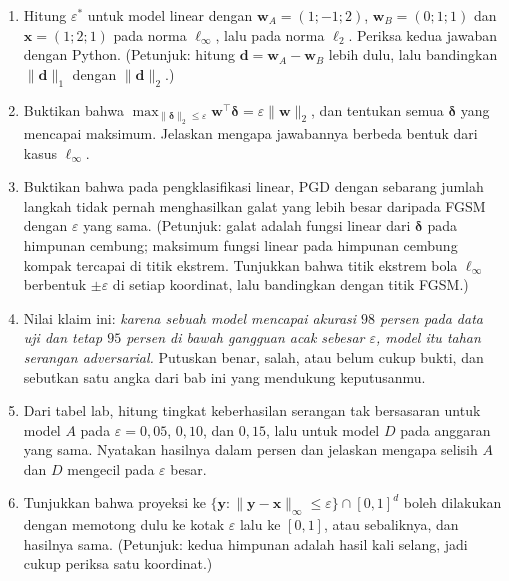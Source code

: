 \begin{latihan}
\begin{enumerate}
  \item Hitung $\varepsilon^{*}$ untuk model linear dengan
        $\mathbf{w}_A=(1;-1;2)$, $\mathbf{w}_B=(0;1;1)$ dan
        $\mathbf{x}=(1;2;1)$ pada norma $\ell_\infty$, lalu pada norma $\ell_2$.
        Periksa kedua jawaban dengan Python. (Petunjuk: hitung
        $\mathbf{d}=\mathbf{w}_A-\mathbf{w}_B$ lebih dulu, lalu bandingkan
        $\lVert\mathbf{d}\rVert_1$ dengan $\lVert\mathbf{d}\rVert_2$.)

  \item Buktikan bahwa $\max_{\lVert\boldsymbol{\delta}\rVert_2\le\varepsilon}
        \mathbf{w}^{\top}\boldsymbol{\delta}=\varepsilon\lVert\mathbf{w}\rVert_2$,
        dan tentukan semua $\boldsymbol{\delta}$ yang mencapai maksimum. Jelaskan
        mengapa jawabannya berbeda bentuk dari kasus $\ell_\infty$.

  \item Buktikan bahwa pada pengklasifikasi linear, PGD dengan sebarang jumlah
        langkah tidak pernah menghasilkan galat yang lebih besar daripada FGSM
        dengan $\varepsilon$ yang sama. (Petunjuk: galat adalah fungsi linear dari
        $\boldsymbol{\delta}$ pada himpunan cembung; maksimum fungsi linear pada
        himpunan cembung kompak tercapai di titik ekstrem. Tunjukkan bahwa titik
        ekstrem bola $\ell_\infty$ berbentuk $\pm\varepsilon$ di setiap koordinat,
        lalu bandingkan dengan titik FGSM.)

  \item Nilai klaim ini: \emph{karena sebuah model mencapai akurasi $98$ persen pada
        data uji dan tetap $95$ persen di bawah gangguan acak sebesar
        $\varepsilon$, model itu tahan serangan adversarial.} Putuskan benar, salah,
        atau belum cukup bukti, dan sebutkan satu angka dari bab ini yang mendukung
        keputusanmu.

  \item Dari tabel lab, hitung tingkat keberhasilan serangan tak bersasaran untuk
        model $A$ pada $\varepsilon=0{,}05$, $0{,}10$, dan $0{,}15$, lalu untuk
        model $D$ pada anggaran yang sama. Nyatakan hasilnya dalam persen dan
        jelaskan mengapa selisih $A$ dan $D$ mengecil pada $\varepsilon$ besar.

  \item Tunjukkan bahwa proyeksi ke
        $\{\mathbf{y}:\lVert\mathbf{y}-\mathbf{x}\rVert_\infty\le\varepsilon\}
        \cap[0,1]^{d}$ boleh dilakukan dengan memotong dulu ke kotak
        $\varepsilon$ lalu ke $[0,1]$, atau sebaliknya, dan hasilnya sama.
        (Petunjuk: kedua himpunan adalah hasil kali selang, jadi cukup periksa
        satu koordinat.)


\end{enumerate}
\end{latihan}
